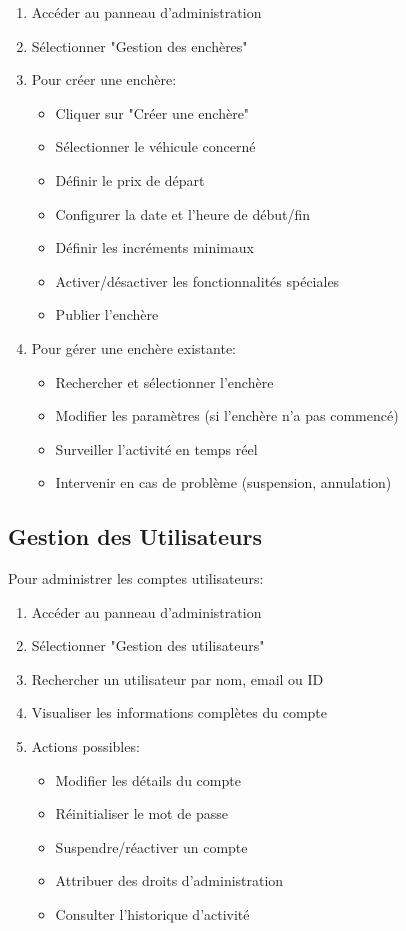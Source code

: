 \begin{enumerate}
    \item Accéder au panneau d'administration
    \item Sélectionner "Gestion des enchères"
    \item Pour créer une enchère:
    \begin{itemize}
        \item Cliquer sur "Créer une enchère"
        \item Sélectionner le véhicule concerné
        \item Définir le prix de départ
        \item Configurer la date et l'heure de début/fin
        \item Définir les incréments minimaux
        \item Activer/désactiver les fonctionnalités spéciales
        \item Publier l'enchère
    \end{itemize}
    \item Pour gérer une enchère existante:
    \begin{itemize}
        \item Rechercher et sélectionner l'enchère
        \item Modifier les paramètres (si l'enchère n'a pas commencé)
        \item Surveiller l'activité en temps réel
        \item Intervenir en cas de problème (suspension, annulation)
    \end{itemize}
\end{enumerate}

\subsection{Gestion des Utilisateurs}

Pour administrer les comptes utilisateurs:

\begin{enumerate}
    \item Accéder au panneau d'administration
    \item Sélectionner "Gestion des utilisateurs"
    \item Rechercher un utilisateur par nom, email ou ID
    \item Visualiser les informations complètes du compte
    \item Actions possibles:
    \begin{itemize}
        \item Modifier les détails du compte
        \item Réinitialiser le mot de passe
        \item Suspendre/réactiver un compte
        \item Attribuer des droits d'administration
        \item Consulter l'historique d'activité
    \end{itemize}
\end{enumerate}

